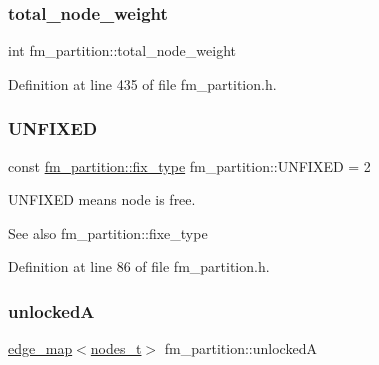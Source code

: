 \subsubsection{\texorpdfstring{total\+\_\+node\+\_\+weight}{total\_node\_weight}}
{\footnotesize\ttfamily int fm\+\_\+partition\+::total\+\_\+node\+\_\+weight\hspace{0.3cm}{\ttfamily [protected]}}



Definition at line 435 of file fm\+\_\+partition.\+h.

\mbox{\label{classfm__partition_a24447561db0ea633212c597c5e1fca56}} 
\subsubsection{\texorpdfstring{U\+N\+F\+I\+X\+ED}{UNFIXED}}
{\footnotesize\ttfamily const \mbox{\hyperlink{classfm__partition_a63693cd93d587dca3d1842f831cd1c55}{fm\+\_\+partition\+::fix\+\_\+type}} fm\+\_\+partition\+::\+U\+N\+F\+I\+X\+ED = 2\hspace{0.3cm}{\ttfamily [static]}}

{\ttfamily U\+N\+F\+I\+X\+ED} means node is free.

\begin{DoxySeeAlso}{See also}
fm\+\_\+partition\+::fixe\+\_\+type 
\end{DoxySeeAlso}


Definition at line 86 of file fm\+\_\+partition.\+h.

\mbox{\label{classfm__partition_a9d75a1d63f711a0c66ae7f5bc181cd8b}} 
\subsubsection{\texorpdfstring{unlockedA}{unlockedA}}
{\footnotesize\ttfamily \mbox{\hyperlink{classedge__map}{edge\+\_\+map}}$<$\mbox{\hyperlink{edge_8h_a22ac17689106ba21a84e7bc54d1199d6}{nodes\+\_\+t}}$>$ fm\+\_\+partition\+::unlockedA\hspace{0.3cm}{\ttfamily [protected]}}



